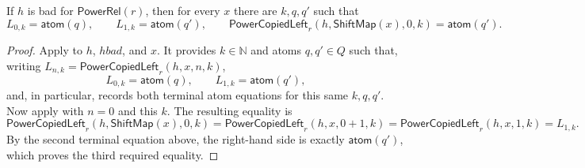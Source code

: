 \begin{lemma}
If $h$ is bad for $\mathsf{PowerRel}(r)$, then for every $x$ there are
$k,q,q'$ such that
\[
L_{0,k}=\mathsf{atom}(q),\qquad
L_{1,k}=\mathsf{atom}(q'),\qquad
\mathsf{PowerCopiedLeft}_r(h,\mathsf{ShiftMap}(x),0,k)
=\mathsf{atom}(q').
\]
\end{lemma}
\begin{proof}
Apply  to $h$, $hbad$, and $x$.  It
provides $k\in\mathbb N$ and atoms $q,q'\in Q$ such that, writing
$L_{n,k}=\mathsf{PowerCopiedLeft}_r(h,x,n,k)$,
\[
L_{0,k}=\mathsf{atom}(q),\qquad
L_{1,k}=\mathsf{atom}(q'),
\]
and, in particular, records both terminal atom equations for this same
$k,q,q'$.  Now apply  with $n=0$ and
this $k$.  The resulting equality is
\[
\mathsf{PowerCopiedLeft}_r(h,\mathsf{ShiftMap}(x),0,k)
=\mathsf{PowerCopiedLeft}_r(h,x,0+1,k)
=\mathsf{PowerCopiedLeft}_r(h,x,1,k)=L_{1,k}.
\]
By the second terminal equation above, the right-hand side is exactly
$\mathsf{atom}(q')$, which proves the third required equality.
\end{proof}
